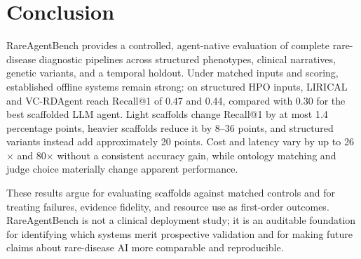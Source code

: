 \documentclass[letterpaper]{article} %
\begin{document}
\section{Conclusion}
\label{sec-10}

RareAgentBench provides a controlled, agent-native evaluation of complete
rare-disease diagnostic pipelines across structured phenotypes, clinical
narratives, genetic variants, and a temporal holdout. Under matched inputs and
scoring, established offline systems remain strong: on structured HPO inputs,
LIRICAL and VC-RDAgent reach Recall@1 of 0.47 and 0.44, compared with 0.30 for
the best scaffolded LLM agent. Light scaffolds change Recall@1 by at most 1.4
percentage points, heavier scaffolds reduce it by 8--36 points, and structured
variants instead add approximately 20 points. Cost and latency vary by up to
26$\times$ and 80$\times$ without a consistent accuracy gain, while ontology
matching and judge choice materially change apparent performance.

These results argue for evaluating scaffolds against matched controls and for
treating failures, evidence fidelity, and resource use as first-order
outcomes. RareAgentBench is not a clinical deployment study; it is an
auditable foundation for identifying which systems merit prospective
validation and for making future claims about rare-disease AI more comparable
and reproducible.

\clearpage

% 

\end{document}
